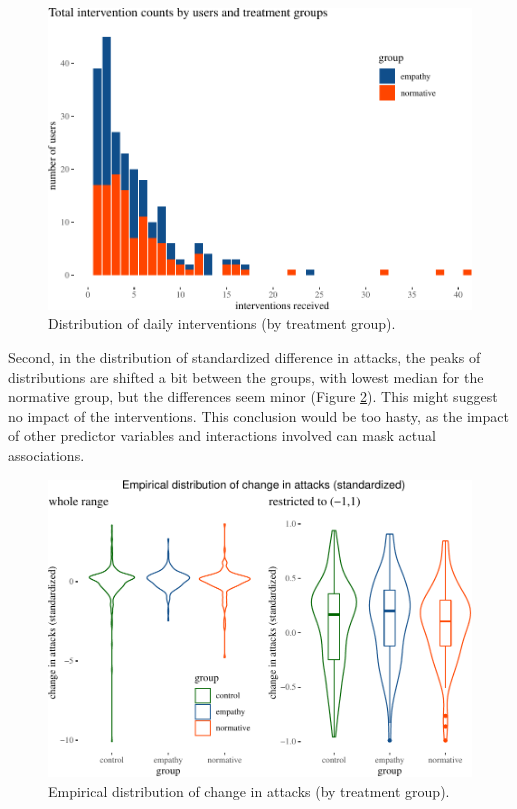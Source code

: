 \documentclass[preprint,12pt]{elsarticle}
\begin{document}
\begin{figure}

\begin{center}\includegraphics[width=.88\linewidth]{figures/interventionsDistroPlot-1} \end{center}
\caption{Distribution of daily interventions (by treatment group).}
\label{fig:interventionsDistro}
\end{figure}

Second, in the distribution of standardized difference in attacks, the
peaks of distributions are shifted a bit between the groups, with lowest
median for the normative group, but the differences seem minor (Figure
\ref{fig:violJoint}). This might suggest no impact of the interventions.
This conclusion would be too hasty, as the impact of other predictor
variables and interactions involved can mask actual associations.




\begin{figure}

\begin{center}\includegraphics[width=1\linewidth]{figures/violJoint-1} \end{center}
\caption{Empirical distribution of change in attacks (by treatment group).}
\label{fig:violJoint}
\end{figure}
\end{document}
